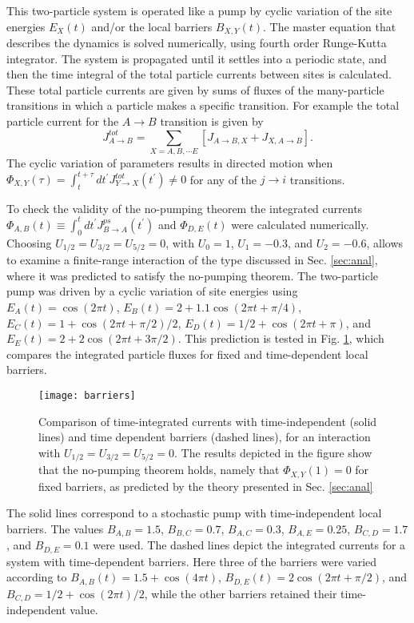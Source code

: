 \documentclass[aps,pre,showpacs,amsmath,amssymb,amsfonts,superscriptaddress,onecolumn,longbibliography]{revtex4-1}
\begin{document}
This two-particle system is operated like a pump by cyclic variation
of the site energies $E_X (t)$ and/or the local barriers $B_{X,Y} (t)$.
The master equation that describes the dynamics is solved numerically, using fourth order Runge-Kutta integrator.
The system is propagated until it settles into a periodic state, and then the time integral of the
total particle currents between sites is calculated. These total particle currents are given by sums of
fluxes of the many-particle transitions in which a particle makes a specific transition. For example the total particle current for the $A \rightarrow B$ transition
is given by
\begin{equation}
\label{eq:totcurrent2}
  J_{A \rightarrow B}^{tot} = \sum_{X=A,B,\cdots E} \left[ J_{A\rightarrow B,X}+J_{X,A\rightarrow B}\right].
\end{equation}
The cyclic variation of parameters results in directed motion when $\Phi_{X,Y} (\tau)= \int_{t}^{t+\tau}dt^\prime J_{Y \rightarrow X}^{tot} (t^\prime) \ne 0$
for any of the $j \rightarrow i$ transitions.

To check the validity of the no-pumping theorem the integrated currents $\Phi_{A,B} (t)\equiv \int_{0}^{t} dt^\prime J^{ps}_{B\rightarrow A} (t^\prime)$ and $\Phi_{D,E} (t)$
were calculated numerically. Choosing $U_{1/2}=U_{3/2}=U_{5/2}=0$, with $U_0=1$, $U_1=-0.3$, and $U_2=-0.6$,
allows to examine a finite-range interaction of the type discussed in Sec. \ref{sec:anal}, where it was predicted to satisfy the
no-pumping theorem.
The two-particle pump was driven by a cyclic variation of site energies using $E_A(t)=\cos (2 \pi t)$, $E_B(t)=2+1.1 \cos (2 \pi t +\pi/4)$,
$E_C(t)=1+\cos(2 \pi t+\pi/2)/2$, $E_D(t)=1/2+\cos(2 \pi t +\pi)$, and $E_E (t)= 2+2 \cos (2 \pi t +3 \pi/2)$. This prediction is
tested in Fig. \ref{fig:barriers}, which compares the integrated particle fluxes for fixed and time-dependent local barriers.
\begin{figure}[h]
\texttt{[image: barriers]}

\caption{Comparison of time-integrated currents with time-independent (solid lines) and time dependent barriers (dashed lines), for an
interaction with $U_{1/2}=U_{3/2}=U_{5/2}=0$. The results depicted in the figure show that the no-pumping theorem holds, namely that $\Phi_{X,Y}(1)=0$ for fixed barriers, as predicted by
the theory presented in Sec. \ref{sec:anal} \label{fig:barriers}}
\end{figure}
The solid lines correspond to a stochastic pump with time-independent local barriers. The values $B_{A,B}=1.5$, $B_{B,C}=0.7$, $B_{A,C}=0.3$, $B_{A,E}=0.25$,
$B_{C,D}=1.7$, and $B_{D,E}=0.1$ were used. The dashed lines depict the integrated currents for a system with time-dependent barriers. Here three
of the barriers were varied according to $B_{A,B}(t)= 1.5+\cos(4 \pi t)$, $B_{D,E}(t)=2 \cos(2 \pi t +\pi/2)$, and $B_{C,D}=1/2+\cos(2 \pi t)/2$, while
the other barriers retained their time-independent value.
\end{document}
